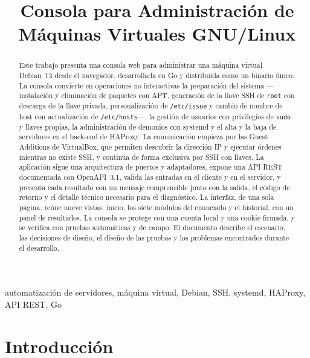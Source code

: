 \documentclass[journal]{IEEEtran}
\title{Consola para Administración de Máquinas Virtuales GNU/Linux}
\author{
  \IEEEauthorblockN{Jorge Acosta \hspace{0.3cm} Andrey Tombe\\
  \vspace{0.5cm}
  {\normalsize Universidad del Quindío}\\
  {\normalsize Facultad de Ingeniería}\\
  {\normalsize Ingeniería de Sistemas y Computación}\\
  {\normalsize Computación en la Nube}\\
  {\normalsize Octubre del 2026}}
}
\begin{document}
\maketitle

\begin{abstract}
Este trabajo presenta una consola web para administrar una máquina
virtual Debian~13 desde el navegador, desarrollada en Go y distribuida
como un binario único. La consola convierte en operaciones no
interactivas la preparación del sistema ---instalación y eliminación de
paquetes con APT, generación de la llave SSH de \texttt{root} con
descarga de la llave privada, personalización de \texttt{/etc/issue} y
cambio de nombre de host con actualización de \texttt{/etc/hosts}---, la
gestión de usuarios con privilegios de \texttt{sudo} y llaves propias, la
administración de demonios con systemd y el alta y la baja de servidores
en el back-end de HAProxy. La comunicación empieza por las Guest
Additions de VirtualBox, que permiten descubrir la dirección IP y
ejecutar órdenes mientras no existe SSH, y continúa de forma exclusiva
por SSH con llaves. La aplicación sigue una arquitectura de puertos y
adaptadores, expone una API REST documentada con OpenAPI~3.1, valida las
entradas en el cliente y en el servidor, y presenta cada resultado con un
mensaje comprensible junto con la salida, el código de retorno y el
detalle técnico necesario para el diagnóstico. La interfaz, de una sola página,
reúne nueve vistas: inicio, los siete módulos del enunciado y el
historial, con un panel de resultados. La consola se protege con una
cuenta local y una cookie firmada, y se verifica con pruebas automáticas
y de campo. El documento describe el escenario, las decisiones
de diseño, el diseño de las pruebas y los problemas encontrados durante el
desarrollo.
\end{abstract}

\begin{IEEEkeywords}
automatización de servidores, máquina virtual, Debian, SSH, systemd,
HAProxy, API REST, Go
\end{IEEEkeywords}

\section{Introducción}
\label{sec:introduccion}
\end{document}
